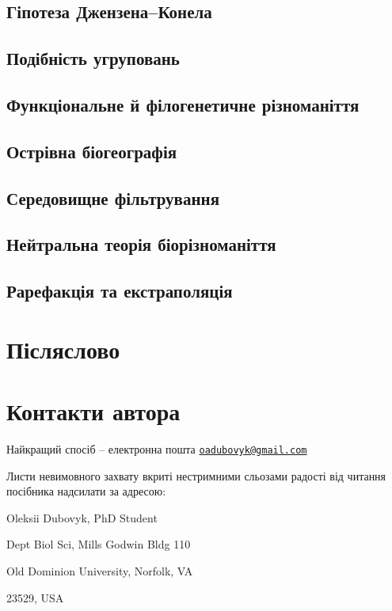 \documentclass[
  11pt,
]{book}
\begin{document}
\section{Гіпотеза Джензена--Конела}\label{janzen}

\section{Подібність угруповань}\label{similarity}

\section{Функціональне й філогенетичне різноманіття}\label{fd}

\section{Острівна біогеографія}\label{islands}

\section{Середовищне фільтрування}\label{env-filter}

\section{Нейтральна теорія біорізноманіття}\label{untb}

\section{Рарефакція та екстраполяція}\label{rarefaction}

\chapter*{Післяслово}\label{goodbye}

\chapter*{Контакти автора}\label{contact}

Найкращий спосіб -- електронна пошта \href{mailto:oadubovyk@gmail.com}{\nolinkurl{oadubovyk@gmail.com}}

Листи невимовного захвату вкриті нестримними сльозами радості від читання посібника надсилати за адресою:

Oleksii Dubovyk, PhD Student

Dept Biol Sci, Mills Godwin Bldg 110

Old Dominion University, Norfolk, VA

23529, USA


\end{document}
